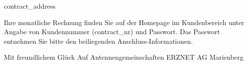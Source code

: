 \documentclass[version=last, fontsize=11pt, fromlogo=true, refline=wide, fromaddress=false, enlargefirstpage=true, numericaldate=true]{scrlttr2}
\begin{document}
\begin{letter}{{contract\_address}}
		\begin{flushleft}
		Ihre monatliche Rechnung finden Sie auf der Homepage im Kundenbereich unter Angabe von Kundennummer ({contract\_nr}) und Passwort.
		Das Passwort entnehmen Sie bitte den beiliegenden Anschluss-Informationen.
		\end{flushleft}
		\par

		\begin{flushleft}
		\vspace{1.1cm}
		Mit freundlichem Glück Auf
		\newline
		\newline
		\newline
		Antennengemeinschaften
		\vspace{0.1cm}
		\newline
		ERZNET AG Marienberg
		\end{flushleft}

	\end{letter}
\end{document}

